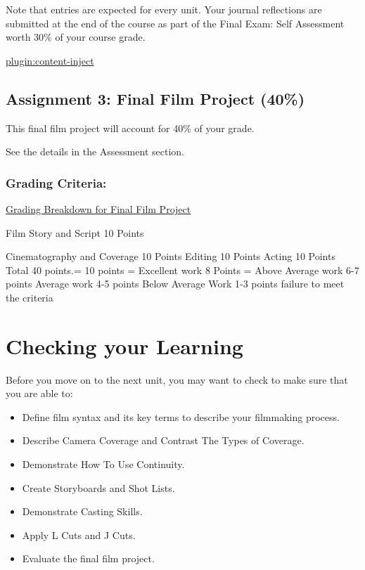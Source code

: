\documentclass[
]{book}
\providecommand{\tightlist}{%
  \setlength{\itemsep}{0pt}\setlength{\parskip}{0pt}}
\begin{document}
Note that entries are expected for every unit. Your journal reflections are submitted at the end of the course as part of the Final Exam: Self Assessment worth 30\% of your course grade.

\href{../../assignments/_assignment-9}{plugin:content-inject}

\hypertarget{assignment-3-final-film-project-40}{%
\subsection*{Assignment 3: Final Film Project (40\%)}\label{assignment-3-final-film-project-40}}

This final film project will account for 40\% of your grade.

See the details in the Assessment section.

\hypertarget{grading-criteria-6}{%
\subsubsection*{Grading Criteria:}\label{grading-criteria-6}}

\ul{Grading Breakdown for Final Film Project}

Film Story and Script 10 Points

Cinematography and Coverage 10 Points
Editing 10 Points
Acting 10 Points
Total 40 points.=
10 points = Excellent work
8 Points = Above Average work
6-7 points Average work
4-5 points Below Average Work
1-3 points failure to meet the criteria

\hypertarget{checking-your-learning-8}{%
\section*{Checking your Learning}\label{checking-your-learning-8}}

\begin{progress}
Before you move on to the next unit, you may want to check to make sure that you are able to:

\begin{itemize}
\tightlist
\item
  Define film syntax and its key terms to describe your filmmaking process.\\
\item
  Describe Camera Coverage and Contrast The Types of Coverage.\\
\item
  Demonstrate How To Use Continuity.\\
\item
  Create Storyboards and Shot Lists.\\
\item
  Demonstrate Casting Skills.\\
\item
  Apply L Cuts and J Cuts.\\
\item
  Evaluate the final film project.
\end{itemize}
\end{progress}
\end{document}
